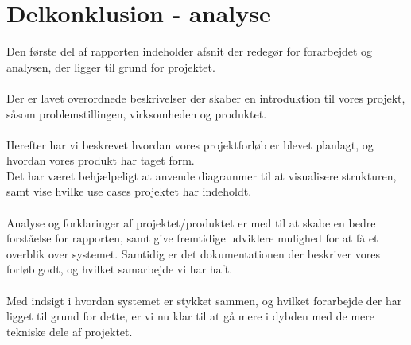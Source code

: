 \hypertarget{delkonklusion-analyse}{}
\section{Delkonklusion - analyse}
Den første del af rapporten indeholder afsnit der redegør for forarbejdet og analysen, der ligger til grund for projektet.
\\\\
Der er lavet overordnede beskrivelser der skaber en introduktion til vores projekt, såsom problemstillingen, virksomheden og produktet.
\\\\
Herefter har vi beskrevet hvordan vores projektforløb er blevet planlagt, og hvordan vores produkt har taget form.\\
Det har været behjælpeligt at anvende diagrammer til at visualisere strukturen, samt vise hvilke use cases projektet har indeholdt.
\\\\
Analyse og forklaringer af projektet/produktet er med til at skabe en bedre forståelse for rapporten, samt give fremtidige udviklere
mulighed for at få et overblik over systemet. Samtidig er det dokumentationen der beskriver vores forløb godt, og hvilket samarbejde vi har haft.
\\\\
Med indsigt i hvordan systemet er stykket sammen, og hvilket forarbejde der har ligget til grund for dette, er vi nu klar til at gå mere i dybden
med de mere tekniske dele af projektet.
